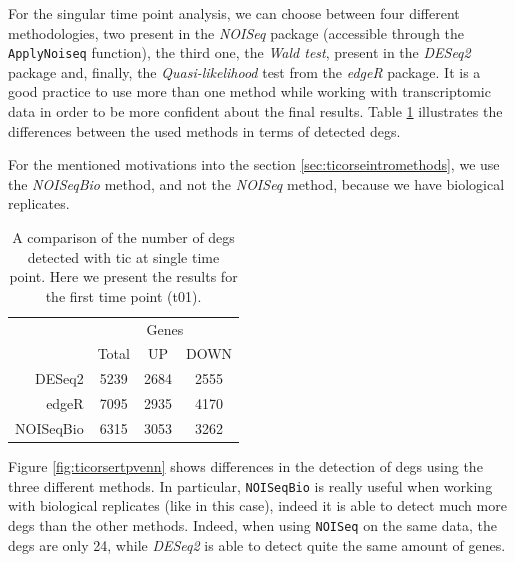 For the singular time point analysis, we can choose between four different methodologies, two present in the \textit{NOISeq} package (accessible through the \lstinline!ApplyNoiseq! function), the third one, the \textit{Wald test}, present in the \textit{DESeq2} package and, finally, the \textit{Quasi-likelihood} test from the \textit{edgeR} package.
It is a good practice to use more than one method while working with transcriptomic data in order to be more confident about the final results.
Table \ref{tab:ticorserderesultstp} illustrates the differences between the used methods in terms of detected \glspl{deg}.

For the mentioned motivations into the section \ref{sec:ticorseintromethods}, we use the \textit{NOISeqBio} method, and not the \textit{NOISeq} method, because we have biological replicates.


\begin{table}[H]
\centering
\begin{tabular}{r c c c}
\multicolumn{1}{r}{} & \multicolumn{3}{c}{Genes} \\
\cline{2-4}
\multicolumn{1}{r}{} & Total & UP & DOWN \\
\cline{2-4}
DESeq2 & 5239 & 2684 & 2555 \\
edgeR & 7095 & 2935 & 4170 \\
NOISeqBio & 6315 & 3053 & 3262 \\
\end{tabular}
\caption[\gls{tic} Single Time Points DE methods results]{A comparison of the number of \glspl{deg} detected with \gls{tic} at single time point. Here we present the results for the first time point (t01).}
\label{tab:ticorserderesultstp}
\end{table}

Figure \ref{fig:ticorsertpvenn} shows differences in the detection of \glspl{deg} using the three different methods.
In particular, \lstinline!NOISeqBio! is really useful when working with biological replicates (like in this case), indeed it is able to detect much more \glspl{deg} than the other methods. 
Indeed, when using \lstinline!NOISeq! on the same data, the \glspl{deg} are only 24, while \textit{DESeq2} is able to detect quite the same amount of genes.

